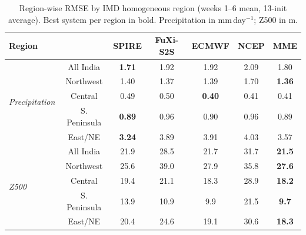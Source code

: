 \documentclass[11pt,a4paper]{article}
\begin{document}
\begin{table}[t]\centering
\small
\setlength{\tabcolsep}{5pt}
\caption{Region-wise RMSE by IMD homogeneous region (weeks 1--6 mean,
13-init average). Best system per region in bold. Precipitation in
mm\,day$^{-1}$; Z500 in m.}\label{tab:reg_rmse}
\begin{tabular}{lcccccc}\toprule
Region & & SPIRE & FuXi-S2S & ECMWF & NCEP & MME \\
\midrule
\multirow{5}{*}{\emph{Precipitation}} &
All India    & \textbf{1.71} & 1.92 & 1.92 & 2.09 & 1.80 \\
& Northwest    & 1.40 & 1.37 & 1.39 & 1.70 & \textbf{1.36} \\
& Central      & 0.49 & 0.50 & \textbf{0.40} & 0.41 & 0.41 \\
& S. Peninsula & \textbf{0.89} & 0.96 & 0.90 & 0.96 & 0.89 \\
& East/NE      & \textbf{3.24} & 3.89 & 3.91 & 4.03 & 3.57 \\
\midrule
\multirow{5}{*}{\emph{Z500}} &
All India    & 21.9 & 28.5 & 21.7 & 31.7 & \textbf{21.5} \\
& Northwest    & 25.6 & 39.0 & 27.9 & 35.8 & \textbf{27.6} \\
& Central      & 19.4 & 21.1 & 18.3 & 28.9 & \textbf{18.2} \\
& S. Peninsula & 13.9 & 10.9 & 9.9  & 21.5 & \textbf{9.7} \\
& East/NE      & 20.4 & 24.6 & 19.1 & 30.6 & \textbf{18.3} \\
\bottomrule
\end{tabular}\end{table}
\end{document}
